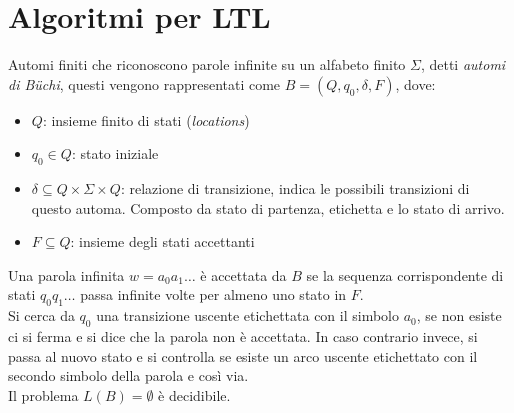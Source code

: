 \section{Algoritmi per LTL}
Automi finiti che riconoscono parole infinite su un alfabeto finito $\Sigma$, detti\textit{ automi di Büchi}, questi vengono rappresentati come $B = (Q, q_0, \delta, F)$, dove:
\begin{itemize}
    \item $Q$: insieme finito di stati (\textit{locations})
    \item $q_0 \in Q$: stato iniziale
    \item $\delta \subseteq Q \times \Sigma \times Q$: relazione di transizione, indica le possibili transizioni di questo automa. Composto da stato di partenza, etichetta e lo stato di arrivo. 
    \item $F \subseteq Q$: insieme degli stati accettanti
\end{itemize}

Una parola infinita $w = a_0 a_1 \dots$ è accettata da $B$ se la sequenza corrispondente di stati $q_0q_1\dots$ passa infinite volte per almeno uno stato in $F$.\\

Si cerca da $q_0$ una transizione uscente etichettata con il simbolo $a_0$, se non esiste ci si ferma e si dice che la parola non è accettata. In caso contrario invece, si passa al nuovo stato e si controlla se esiste un arco uscente etichettato con il secondo simbolo della parola e così via.\\

Il problema $L(B) = \emptyset$ è decidibile.
